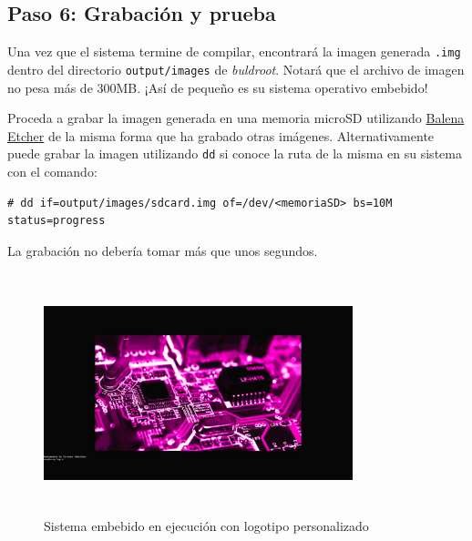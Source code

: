 %
%



\subsection{Paso 6: Grabación y prueba}%
\label{sec:step6}
Una vez que el sistema termine de compilar, encontrará la imagen generada \texttt{.img} dentro del directorio \texttt{output/images} de \emph{buldroot}.
Notará que el archivo de imagen no pesa más de 300MB.
¡Así de pequeño es su sistema operativo embebido!

Proceda a grabar la imagen generada en una memoria microSD utilizando \href{https://etcher.balena.io/}{Balena Etcher} de la misma forma que ha grabado otras imágenes.
Alternativamente puede grabar la imagen utilizando \texttt{dd} si conoce la ruta de la misma en su sistema con el comando:

\begin{Verbatim}[gobble=1]
	# dd if=output/images/sdcard.img of=/dev/<memoriaSD> bs=10M status=progress
\end{Verbatim}

\noindent
La grabación no debería tomar más que unos segundos.

\begin{figure}
	\centering
	\includegraphics[width=0.8\textwidth,height=7cm,keepaspectratio]{img/system-running.jpg}
	\caption{Sistema embebido en ejecución con logotipo personalizado}%
	\label{fig:system-running}
\end{figure}
\medskip{}

